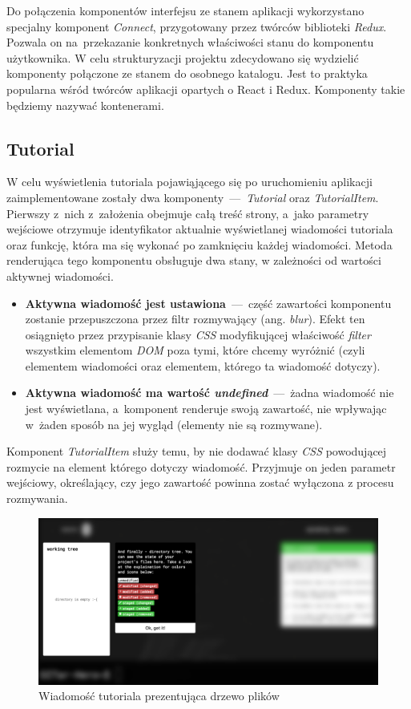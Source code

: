 \documentclass[12pt,a4paper,polish,thesis]{dcsbook}
\begin{document}
{	Do połączenia komponentów interfejsu ze stanem aplikacji wykorzystano specjalny komponent \textit{Connect}, przygotowany przez twórców biblioteki \textit{Redux}. Pozwala on na~przekazanie konkretnych właściwości stanu do komponentu użytkownika. W celu strukturyzacji projektu zdecydowano się wydzielić komponenty połączone ze stanem do osobnego katalogu. Jest to praktyka popularna wśród twórców aplikacji opartych o React i Redux. Komponenty takie będziemy nazywać kontenerami.

	\subsection{Tutorial}

	W celu wyświetlenia tutoriala pojawiąjącego się po uruchomieniu aplikacji zaimplementowane zostały dwa komponenty~---~\textit{Tutorial} oraz \textit{TutorialItem}. Pierwszy z~nich z~założenia obejmuje całą treść strony, a~jako parametry wejściowe otrzymuje identyfikator aktualnie wyświetlanej wiadomości tutoriala oraz funkcję, która ma się wykonać po zamknięciu każdej wiadomości. Metoda renderująca tego komponentu obsługuje dwa stany, w zależności od wartości aktywnej wiadomości. 
	\begin{itemize}
		\item \textbf{Aktywna wiadomość jest ustawiona}~---~część zawartości komponentu zostanie przepuszczona przez filtr rozmywający (ang. \textit{blur}). Efekt ten osiągnięto przez przypisanie klasy \textit{CSS} modyfikującej właściwość  \textit{filter} wszystkim elementom \textit{DOM} poza tymi, które chcemy wyróżnić (czyli elementem wiadomości oraz elementem, którego ta wiadomość dotyczy).
		\item \textbf{Aktywna wiadomość ma wartość \textit{undefined}}~---~żadna wiadomość nie jest wyświetlana, a~komponent renderuje swoją zawartość, nie wpływając w~żaden sposób na jej wygląd (elementy nie są rozmywane).
	\end{itemize}
	Komponent \textit{TutorialItem} służy temu, by nie dodawać klasy \textit{CSS} powodującej rozmycie na element którego dotyczy wiadomość. Przyjmuje on jeden parametr wejściowy, określający, czy jego zawartość powinna zostać wyłączona z procesu rozmywania.

	\begin{figure}[h]
		\centering
		\includegraphics[width=15cm]{component-tutorial}
		\caption{Wiadomość tutoriala prezentująca drzewo plików}
		\label{fig:tutorial}
	\end{figure}
	\FloatBarrier

}
\end{document}

